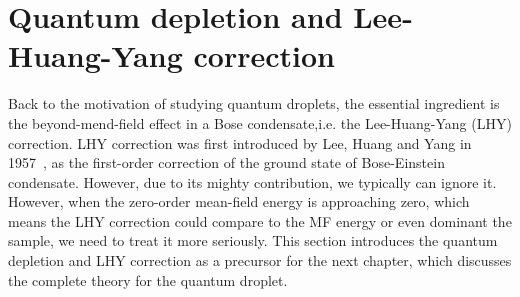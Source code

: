 \section{Quantum depletion and Lee-Huang-Yang correction}
\label{sec:intro-LHY}

Back to the motivation of studying quantum droplets, the essential ingredient is the beyond-mend-field effect in a Bose condensate,i.e. the Lee-Huang-Yang (LHY) correction. LHY correction was first introduced by Lee, Huang and Yang in 1957~\cite{lee1957}, as the first-order correction of the ground state of Bose-Einstein condensate. However, due to its mighty contribution, we typically can ignore it. However, when the zero-order mean-field energy is approaching zero, which means the LHY correction could compare to the MF energy or even dominant the sample, we need to treat it more seriously. This section introduces the quantum depletion and LHY correction as a precursor for the next chapter, which discusses the complete theory for the quantum droplet.

